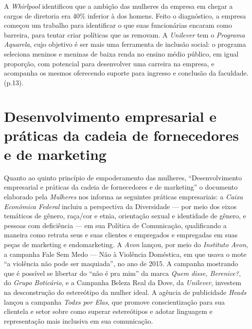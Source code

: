 A \emph{Whirlpool} identificou que a ambição das mulheres da empresa em
chegar a cargos de diretoria era 40\% inferior à dos homens. Feito o
diagnóstico, a empresa começou um trabalho para identificar o que suas
funcionárias encaram como barreira, para tentar criar políticas que as
removam. A \emph{Unilever} tem o \emph{Programa Aquarela}, cujo objetivo
é ser mais uma ferramenta de inclusão social: o programa seleciona
meninos e meninas de baixa renda no ensino médio público, em igual
proporção, com potencial para desenvolver uma carreira na empresa, e
acompanha os mesmos oferecendo suporte para ingresso e conclusão da
faculdade. (p.13).

\section{Desenvolvimento empresarial e práticas da cadeia de fornecedores e de marketing}

Quanto ao quinto princípio de empoderamento das mulheres,
``Desenvolvimento empresarial e práticas da cadeia de fornecedores e de
marketing'' o documento elaborado pela \emph{ Mulheres} nos informa
as seguintes práticas empresariais: a \emph{Caixa Econômica Federal}
incluiu a perspectiva da Diversidade --- por meio dos eixos temáticos de
gênero, raça/cor e etnia, orientação sexual e identidade de gênero, e
pessoas com deficiência --- em sua Política de Comunicação, qualificando
a maneira como retrata seus e suas clientes e empregados e empregadas em
suas peças de marketing e endomarketing. A \emph{Avon} lançou, por meio
do \emph{Instituto Avon}, a campanha Fale Sem Medo --- Não à Violência
Doméstica, em que usava o mote ``a violência não pode ser maquiada'', no
ano de 2015. A campanha mostrando que é possível se libertar do ``não é
pra mim'' da marca \emph{Quem disse, Berenice?}, do \emph{Grupo
Boticário}, e a Campanha Beleza Real da Dove, da \emph{Unilever},
investem na desconstrução do estereótipo da mulher ideal. A agência de
publicidade \emph{Heads} lançou a campanha \emph{Todxs por Elas}, que
promove conscientização para sua clientela e setor sobre como superar
estereótipos e adotar linguagem e representação mais inclusiva em sua
comunicação.

